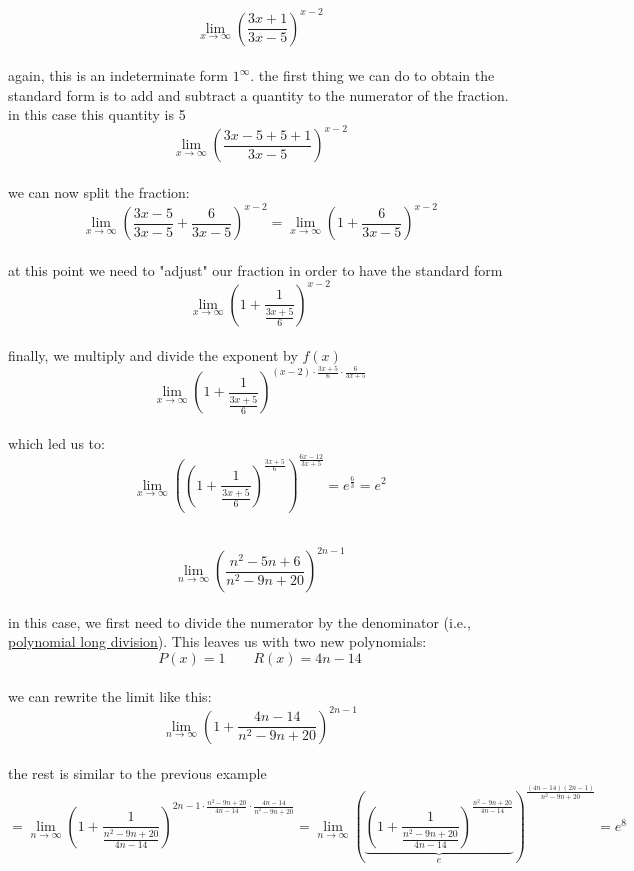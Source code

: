\documentclass[a4paper,12pt]{article}
\newcommand{\?}{\stackrel{?}{=}}
\begin{document}
\begin{my_example}
\[
  \lim_{x \to \infty} \left(  \frac{3x+1}{3x-5} \right)^{x-2}
\]\\[0pt]
again, this is an indeterminate form \(1^\infty\). the first thing we can do to obtain the standard form is to add and subtract a quantity to the numerator of the fraction. in this case this quantity is 5\\[0pt]
\[
  \lim_{x\to\infty} \left(\frac{3x-5+5+1}{3x-5}\right)^{x-2}
\]\\[0pt]
we can now split the fraction:\\[0pt]
\[
  \lim_{x\to\infty} \left(\frac{3x-5}{3x-5} + \frac{6}{3x-5}\right)^{x-2} = \lim_{x\to\infty} \left(1+\frac{6}{3x-5}\right)^{x-2}
\]\\[0pt]
at this point we need to "adjust" our fraction in order to have the standard form\\[0pt]
\[
  \lim_{x\to\infty} \left(1+\frac{1}{\frac{3x+5}{6}}\right)^{x-2}
\]\\[0pt]
finally, we multiply and divide the exponent by \(f(x)\)\\[0pt]
\[
  \lim_{x\to\infty} \left(1+\frac{1}{\frac{3x+5}{6}}\right)^{(x-2) \cdot \frac{3x+5}{6} \cdot \frac{6}{3x+5}}
\]\\[0pt]
which led us to:\\[0pt]
\[
  \lim_{x\to\infty} \left(\left(1+\frac{1}{\frac{3x+5}{6}}\right)^{\frac{3x+5}{6}}\right)^{\frac{6x-12}{3x+5}} = e^\frac{6}{3} = e^2
\]\\[0pt]
\end{my_example}

\begin{my_example}
\[
  \lim_{n\to\infty} \left(\frac{n^2-5n+6}{n^2-9n+20}\right)^{2n-1}
\]\\[0pt]
in this case, we first need to divide the numerator by the denominator (i.e., \hyperref[sec:org4103a69]{polynomial long division}). This leaves us with two new polynomials:\\[0pt]
\[
  P(x)=1 \qquad R(x)=4n-14
\]\\[0pt]
we can rewrite the limit like this:\\[0pt]
\[
  \lim_{n\to\infty} \left(1+\frac{4n-14}{n^2-9n+20}\right)^{2n-1}
\]\\[0pt]
the rest is similar to the previous example\\[0pt]
\[
  = \lim_{n\to\infty} \left(1+\frac{1}{\frac{n^2-9n+20}{4n-14}}\right)^{2n-1 \cdot \frac{n^2-9n+20}{4n-14} \cdot \frac{4n-14}{n^2-9n+20}} = \lim_{n\to\infty} \left( \underbrace{\left(1+\frac{1}{\frac{n^2-9n+20}{4n-14}}\right)^{\frac{n^2-9n+20}{4n-14}}}_{e}\right)^{\frac{(4n-14)(2n-1)}{n^2-9n+20}} = e^8
\]\\[0pt]
\end{my_example}
\end{document}
